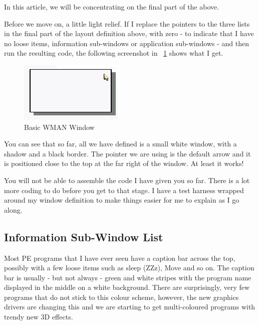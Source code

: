 In this article, we will be concentrating on the final part of the above.

Before we move on, a little light relief. If I replace the pointers to the three
lists in the final part of the layout definition above, with zero -{} to indicate that I have
no loose items, information sub-{}windows or application sub-{}windows -{} and then run the
resulting code, the following screenshot in \figurename~\ref{fig:FirstWindowInAction} shows what I get.

\begin{figure}[h]
\center
\includegraphics{Content/images/SystemInfo_1.png}
\caption{Basic WMAN Window}
\label{fig:FirstWindowInAction}
\end{figure}

You can see that so far, all we have defined is a small white window, with a shadow
and a black border. The pointer we are using is the default arrow and it is positioned
close to the top at the far right of the window. At least it works!

\begin{note}
You will not be able to assemble the code I have given you so far. There is a
lot more coding to do before you get to that stage. I have a test harness wrapped around
my window definition to make things easier for me to explain as I go along.
\end{note}

\subsection{Information Sub-{}Window List}
\label{ch23-info-windows}%

Most PE programs that I have ever seen have a caption bar across the top, possibly
with a few loose items such as sleep (ZZz), Move and so on. The caption bar is usually -{}
but not always -{} green and white stripes with the program name displayed in the middle on
a white background. There are surprisingly, very few programs that do not stick to this
colour scheme, however, the new graphics drivers are changing this and we are starting to
get multi-{}coloured programs with trendy new 3D effects.

